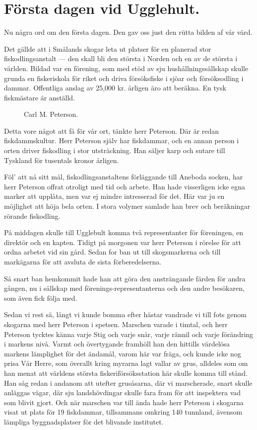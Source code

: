 \chapter{Första dagen vid Ugglehult.}

Nu några ord om den första dagen. Den gav oss just den
rütta bilden af vår värd.

Det gällde att i Smålands skogar leta ut platser för en
planerad stor fiskodlingsanstalt — den skall bli den största i Norden
och en av de största i världen. Bildad var en förening, som med
stöd av sju hushållningssällskap skulle grunda en fiskeriskola för
riket och driva försöksfiske i sjöar och försöksodling i dammar.
Offentliga anslag av 25,000 kr. årligen äro att beräkna. En
tysk fiskmästare är anställd.

\begin{figure}[H]
    \centering
    
    \caption{Carl M. Peterson.}
\end{figure}

Detta vore något att få
för vår ort, tänkte herr
Peterson. Där är redan
fiskdammskultur. Herr Peterson själv har
fiskdammar, och en annan
person i orten driver fiskodling i
stor utsträckning. Han säljer
karp och sutare till Tyskland
för tusentals kronor årligen.

Föl' att nå sitt mål,
fiskodlingsanstaltens förläggande
till Aneboda socken, har herr
Peterson offrat otroligt med
tid och arbete. Han hade
visserligen icke egna marker
att upplåta, men var ej
mindre intresserad för det. Här
var ju en möjlighet att höja
bela orten. I stora volymer samlade han brev och beräkningar
rörande fiskodling.

På middagen skulle till Ugglebult komma två representanter
för föreningen, en direktör och en kapten. Tidigt på morgonen
var herr Peterson i rörelse för att ordna arbetet vid sin gård.
Sedan for ban ut till skogsmarkerna och till markägarna för att
avsluta de sista förberedelserna.

Så snart ban hemkommit hade han att göra den
ansträngande färden för andra gången, nu i sällskap med
förenings-representanterna och den andre besökaren, som även fick följa
med.


Sedan vi rest sä, långt vi kunde bomma efter hästar
vandrade vi till fots genom skogarna med herr Peterson i spetsen.
Marschen varade i timtal, och herr Peterson tycktes känna varje
Stig och varje snår, varje rännil och varje förändring i markens
nivå. Varmt och övertygande framhöll han den hittills
värdelösa markens lämplighet för det ändamål, varom här var fräga,
och kunde icke nog prisa Vår Herre, som överallt kring myrarna
lagt vallar av grus, alldeles som om han menat att världens
största fiskeriförsöksstation här skulle komma till stånd. Han såg
redan i andanom att utefter grusåsarna, där vi marscherade, snart
skulle anläggas vägar, där sju landshövdingar skulle fara fram
för att inspektera vad som blivit gjort. Och när marschen var
till ända hade herr Peterson i skogarna visat ut plats för 19
fiskdammar, tillsammans omkring 140 tunnland, ävensom lämpliga
byggnadsplatser för det blivande institutet.

